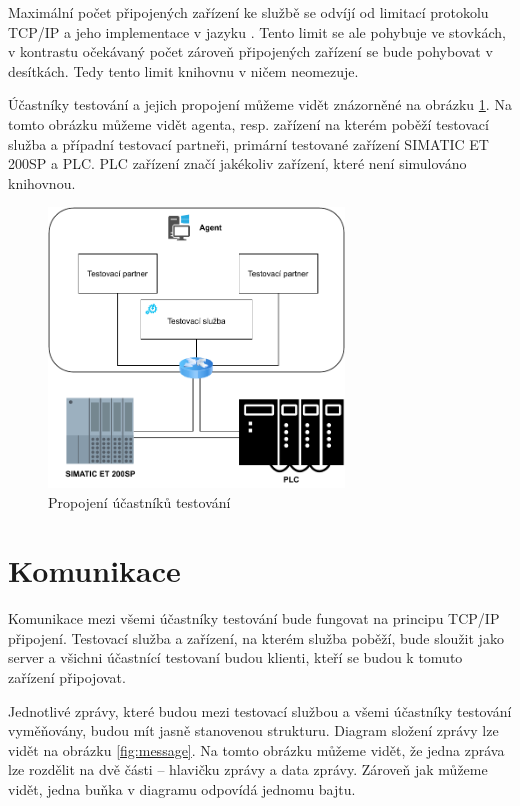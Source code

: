 Maximální počet připojených zařízení ke službě se odvíjí od limitací protokolu TCP/IP a jeho implementace v jazyku \csharp{}. Tento limit se ale pohybuje ve stovkách, v kontrastu očekávaný počet zároveň připojených zařízení se bude pohybovat v desítkách. Tedy tento limit knihovnu v ničem neomezuje.

Účastníky testování a jejich propojení můžeme vidět znázorněné na obrázku \ref{fig:devicemodel}. Na tomto obrázku můžeme vidět agenta, resp. zařízení na kterém poběží testovací služba a případní testovací partneři, primární testované zařízení SIMATIC ET 200SP a PLC. PLC zařízení značí jakékoliv zařízení, které není simulováno knihovnou.

\begin{figure}[htbp]
    \centering 
    \includegraphics[width=0.7\textwidth]{assets/img/devicemodel.pdf}
    \caption{Propojení účastníků testování}
    \label{fig:devicemodel}
\end{figure}

\section{Komunikace}
Komunikace mezi všemi účastníky testování bude fungovat na principu TCP/IP připojení. Testovací služba a zařízení, na kterém služba poběží, bude sloužit jako server a všichni účastnící testovaní budou klienti, kteří se budou k tomuto zařízení připojovat. 

Jednotlivé zprávy, které budou mezi testovací službou a všemi účastníky testování vyměňovány, budou mít jasně stanovenou strukturu. Diagram složení zprávy lze vidět na obrázku \ref{fig:message}. Na tomto obrázku můžeme vidět, že jedna zpráva lze rozdělit na dvě části -- hlavičku zprávy a data zprávy. Zároveň jak můžeme vidět, jedna buňka v diagramu odpovídá jednomu bajtu. 

